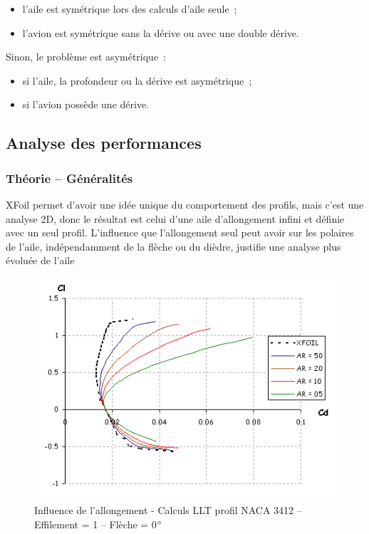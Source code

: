 \documentclass[a4paper,twoside,12pt,dvips]{article}
\begin{document}
\begin{itemize}
	\item l’aile est symétrique lors des calculs d’aile seule~;
	\item l’avion est symétrique sans la dérive ou avec une double dérive.
\end{itemize}

Sinon, le problème est asymétrique~:
\begin{itemize}
	\item si l’aile, la profondeur ou la dérive est asymétrique~;
	\item si l’avion possède une dérive.
\end{itemize}

\subsection{Analyse des performances}

\subsubsection{Théorie – Généralités}

XFoil permet d’avoir une idée unique du comportement des profils, mais c’est 
une analyse 2D, donc le résultat est celui d’une aile d’allongement infini 
et définie avec un seul profil. L’influence que l’allongement seul peut avoir 
sur les polaires de l’aile, indépendamment de la flèche ou du dièdre, justifie 
une analyse plus évoluée de l’aile 

\begin{figure}[htbp]
  \centering
  \includegraphics[width=0.8\linewidth]{img-15}
  \caption{Influence de l’allongement - Calculs LLT profil NACA 3412 –
  Effilement = 1 – Flèche = 0$\degree$}
  \label{img:influence_allongement}
\end{figure}
\end{document}
